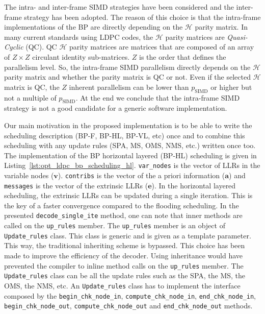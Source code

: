 The intra- and inter-frame SIMD strategies have been considered and the
inter-frame strategy has been adopted. The reason of this choice is that
the intra-frame implementations of the BP are directly depending on the
$\mathcal{H}$ parity matrix. In many current standards using LDPC codes, the
$\mathcal{H}$ parity matrices are \emph{Quasi-Cyclic} (QC). QC $\mathcal{H}$
parity matrices are matrices that are composed of an array of $Z \times Z$
circulant identity sub-matrices. $Z$ is the order that defines the parallelism
level. So, the intra-frame SIMD parallelism directly depends on the
$\mathcal{H}$ parity matrix and whether the parity matrix is QC or not. Even if
the selected $\mathcal{H}$ matrix is QC, the $Z$ inherent parallelism can be
lower than $p_\text{SIMD}$ or higher but not a multiple of $p_\text{SIMD}$. At
the end we conclude that the intra-frame SIMD strategy is not a good candidate
for a generic software implementation.

Our main motivation in the proposed implementation is to be able to write the
scheduling description (BP-F, BP-HL, BP-VL, etc) once and to combine this
scheduling with any update rules (SPA, MS, OMS, NMS, etc.) written once too.
The implementation of the BP horizontal layered (BP-HL) scheduling is given in
Listing~\ref{lst:opt_ldpc_bp_scheduling_hl}. \verb|var_nodes| is the vector of
LLRs in the variable nodes ($\bm{v}$). \verb|contribs| is the vector of the a
priori information ($\bm{a}$) and \verb|messages| is the vector of the extrinsic
LLRs ($\bm{e}$). In the horizontal layered scheduling, the extrinsic LLRs can be
updated during a single iteration. This is the key of a faster convergence
compared to the flooding scheduling. In the presented \verb|decode_single_ite|
method, one can note that inner methods are called on the \verb|up_rules|
member. The \verb|up_rules| member is an object of \verb|Update_rules| class.
This class is generic and is given as a template parameter. This way, the
traditional inheriting scheme is bypassed. This choice has been made to improve
the efficiency of the decoder. Using inheritance would have prevented the
compiler to inline method calls on the \verb|up_rules| member. The
\verb|Update_rules| class can be all the update rules such as the SPA, the MS,
the OMS, the NMS, etc. An \verb|Update_rules| class has to implement the
interface composed by the \verb|begin_chk_node_in|, \verb|compute_chk_node_in|,
\verb|end_chk_node_in|, \verb|begin_chk_node_out|, \verb|compute_chk_node_out|
and \verb|end_chk_node_out| methods.

